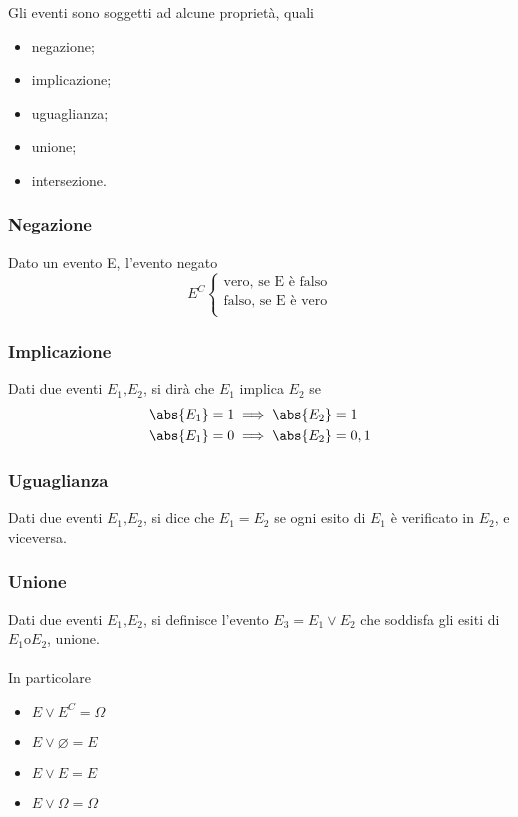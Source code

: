 \documentclass{subfiles}
\begin{document}
Gli eventi sono soggetti ad alcune proprietà, quali
\begin{itemize}
    \item negazione;
    \item implicazione;
    \item uguaglianza;
    \item unione;
    \item intersezione.
\end{itemize}

\subsubsection{Negazione}
Dato un evento E, l'evento negato
\[E^{C} \begin{cases}
        \text{vero, se E è falso} \\
        \text{falso, se E è vero} \\
    \end{cases}\]

\subsubsection{Implicazione}
Dati due eventi \(E_{1} \text{,} E_{2}\), si dirà che \(E_{1}\) implica \(E_{2}\) se
\[\begin{aligned}
        \abs{E_{1}} & = 1 \implies \abs{E_{2}} = 1    \\
        \abs{E_{1}} & = 0 \implies \abs{E_{2}} = 0, 1 \\
    \end{aligned}\]

\subsubsection{Uguaglianza}
Dati due eventi \(E_{1} \text{,} E_{2}\), si dice che \(E_{1} = E_{2}\) se ogni esito di \(E_{1}\) è verificato in \(E_{2}\), e viceversa.

\subsubsection{Unione}
Dati due eventi \(E_{1} \text{,} E_{2}\), si definisce l'evento \(E_{3} = E_{1} \lor E_{2}\) che soddisfa gli esiti di \(E_{1} \text{o} E_{2}\), unione.
\\ \\
In particolare
\begin{itemize}
    \item \(E \lor E^{C} = \Omega\) \\
    \item \(E \lor \varnothing = E\) \\
    \item \(E \lor E = E\) \\
    \item \(E \lor \Omega = \Omega\)
\end{itemize}
\end{document}
